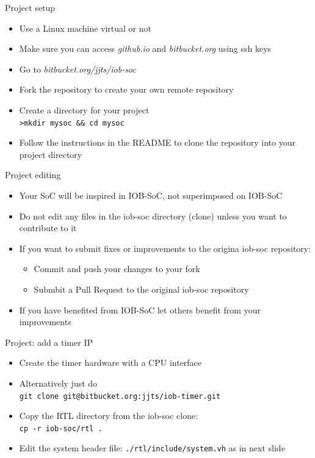 \documentclass [xcolor=svgnames, t] {beamer}
\begin{document}
\begin{frame}{Project setup}
\begin{center}
  \begin{itemize}
    \item Use a Linux machine virtual or not
    \item Make sure you can access {\it github.io} and {\it bitbucket.org} using ssh keys
    \item Go to {\it bitbucket.org/jjts/iob-soc}
    \item Fork the repository to create your own remote repository
    \item Create a directory for your project\\
      {\tt >mkdir mysoc \&\& cd mysoc}
    \item Follow the instructions in the README to clone the repository into your project directory
  \end{itemize}
\end{center}
\end{frame}


\begin{frame}{Project editing}
\begin{itemize}
\item Your SoC will be inspired in IOB-SoC, not superimposed on IOB-SoC
\item Do not edit any files in the iob-soc directory (clone) unless you want to contribute to it
\item If you want to submit fixes or improvements to the origina iob-soc repository:
  \begin{itemize}
  \item Commit and push your changes to your fork
  \item Submbit a Pull Request to the original iob-soc repository
  \end{itemize}
\item If you have benefited from IOB-SoC let others benefit from your improvements
\end{itemize}
\end{frame}

\begin{frame}{Project: add a timer IP}
\begin{itemize}
\item Create the timer hardware with a CPU interface
\item Alternatively just do 
  \\{\tt git clone git@bitbucket.org:jjts/iob-timer.git}
\item Copy the RTL directory from the iob-soc clone:
  \\{\tt cp -r iob-soc/rtl .}
\item Edit the system header file: {\tt ./rtl/include/system.vh} as in next slide\\
\end{itemize}
\end{frame}
\end{document}
